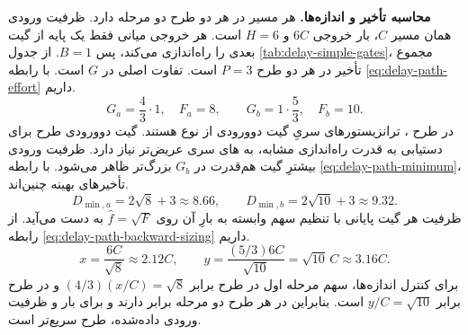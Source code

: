\textbf{محاسبه تأخیر و اندازه‌ها.}
هر مسیر در هر دو طرح دو مرحله دارد. ظرفیت ورودی همان مسیر
\(C\)، بار خروجی \(6C\) و \(H=6\) است. هر خروجی میانی
فقط یک پایه از گیت بعدی را راه‌اندازی می‌کند، پس \(B=1\).
از جدول \ref{tab:delay-simple-gates}، مجموع تأخیر
 در هر دو طرح \(P=3\) است. تفاوت اصلی در
\(G\) است.
با رابطه \eqref{eq:delay-path-effort} داریم.\[
  G_a=\frac43\cdot1,\quad F_a=8,
  \qquad
  G_b=1\cdot\frac53,\quad F_b=10.
\]
در طرح ، ترانزیستورهای سریِ گیت دوورودی از نوع
 هستند. گیت دوورودی طرح  برای دستیابی
به قدرت راه‌اندازی مشابه، به های سری عریض‌تر
نیاز دارد. ظرفیت ورودی بیشترِ گیت هم‌قدرت در \(G_b\) بزرگ‌تر
ظاهر می‌شود.
با رابطه \eqref{eq:delay-path-minimum}، تأخیرهای
بهینه چنین‌اند.
\[
  D_{\min,a}=2\sqrt{8}+3\approx8.66,
  \qquad
  D_{\min,b}=2\sqrt{10}+3\approx9.32.
\]
ظرفیت هر گیت پایانی با تنظیم سهم وابسته به بارِ آن روی
\(\widehat f=\sqrt F\) به دست می‌آید.
از رابطه \eqref{eq:delay-path-backward-sizing} داریم.\[
  x=\frac{6C}{\sqrt8}\approx2.12C,
  \qquad
  y=\frac{(5/3)6C}{\sqrt{10}}=\sqrt{10}\,C\approx3.16C.
\]
برای کنترل اندازه‌ها، سهم مرحله اول در طرح 
برابر \((4/3)(x/C)=\sqrt8\) و در طرح  برابر
\(y/C=\sqrt{10}\) است. بنابراین در هر طرح دو مرحله
 برابر دارند و برای بار و ظرفیت ورودی
داده‌شده، طرح  سریع‌تر است.
